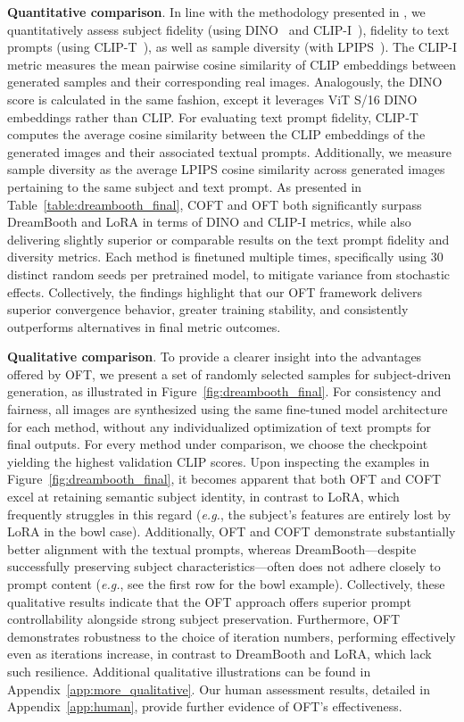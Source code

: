\textbf{Quantitative comparison}. In line with the methodology presented in \cite{ruiz2023dreambooth}, we quantitatively assess subject fidelity (using DINO~\cite{caron2021emerging} and CLIP-I~\cite{radford2021learning}), fidelity to text prompts (using CLIP-T~\cite{radford2021learning}), as well as sample diversity (with LPIPS~\cite{zhang2018unreasonable}). The CLIP-I metric measures the mean pairwise cosine similarity of CLIP embeddings between generated samples and their corresponding real images. Analogously, the DINO score is calculated in the same fashion, except it leverages ViT S/16 DINO embeddings rather than CLIP. For evaluating text prompt fidelity, CLIP-T computes the average cosine similarity between the CLIP embeddings of the generated images and their associated textual prompts. Additionally, we measure sample diversity as the average LPIPS cosine similarity across generated images pertaining to the same subject and text prompt. As presented in Table~\ref{table:dreambooth_final}, COFT and OFT both significantly surpass DreamBooth and LoRA in terms of DINO and CLIP-I metrics, while also delivering slightly superior or comparable results on the text prompt fidelity and diversity metrics. Each method is finetuned multiple times, specifically using 30 distinct random seeds per pretrained model, to mitigate variance from stochastic effects. Collectively, the findings highlight that our OFT framework delivers superior convergence behavior, greater training stability, and consistently outperforms alternatives in final metric outcomes.

\textbf{Qualitative comparison}. To provide a clearer insight into the advantages offered by OFT, we present a set of randomly selected samples for subject-driven generation, as illustrated in Figure~\ref{fig:dreambooth_final}. For consistency and fairness, all images are synthesized using the same fine-tuned model architecture for each method, without any individualized optimization of text prompts for final outputs. For every method under comparison, we choose the checkpoint yielding the highest validation CLIP scores. Upon inspecting the examples in Figure~\ref{fig:dreambooth_final}, it becomes apparent that both OFT and COFT excel at retaining semantic subject identity, in contrast to LoRA, which frequently struggles in this regard (\emph{e.g.}, the subject’s features are entirely lost by LoRA in the bowl case). Additionally, OFT and COFT demonstrate substantially better alignment with the textual prompts, whereas DreamBooth—despite successfully preserving subject characteristics—often does not adhere closely to prompt content (\emph{e.g.}, see the first row for the bowl example). Collectively, these qualitative results indicate that the OFT approach offers superior prompt controllability alongside strong subject preservation. Furthermore, OFT demonstrates robustness to the choice of iteration numbers, performing effectively even as iterations increase, in contrast to DreamBooth and LoRA, which lack such resilience. Additional qualitative illustrations can be found in Appendix~\ref{app:more_qualitative}. Our human assessment results, detailed in Appendix~\ref{app:human}, provide further evidence of OFT’s effectiveness.

